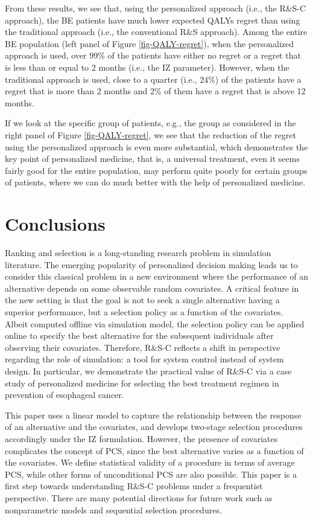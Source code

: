 \documentclass[ijoc,nonblindrev]{informs3}
\begin{document}
From these results, we see that, using the personalized approach (i.e., the R\&S-C approach), the BE patients have much lower expected QALYs regret than using the traditional approach (i.e., the conventional R\&S approach).
Among the entire BE population (left panel of Figure \ref{fig-QALY-regret}),
when the personalized approach is used, over 99\% of the patients have either no regret or a regret that is less than or equal to 2 months (i.e., the IZ parameter).
However, when the traditional approach is used, close to a quarter (i.e., 24\%) of the patients have a regret that  is more than 2 months and 2\% of them have a regret that is above 12 months.


If we look at the specific group of patients, e.g., the group as considered in the right panel of Figure \ref{fig-QALY-regret},
we see that the reduction of the regret using the personalized approach is even more substantial, which demonstrates the key point of personalized medicine,
that is, a universal treatment, even it seems fairly good for the entire population, may perform quite poorly for certain groups of patients, where we can do much better with the help of personalized medicine.


\section{Conclusions} \label{sec-conclusion}

Ranking and selection is a long-standing research problem in simulation literature.
The emerging popularity of personalized decision making leads us to consider this classical problem in a new environment where the performance of an alternative depends on some observable random covariates.
A critical feature in the new setting is that the goal is not to seek a single alternative having a superior performance, but a selection policy as a function of the covariates.
Albeit computed offline via simulation model, the selection policy can be applied online to specify the best alternative for the subsequent individuals after observing their covariates.
Therefore, R\&S-C reflects a shift in perspective regarding the role of simulation:  a tool for system control instead of system design.
In particular, we demonstrate the practical value of R\&S-C via a case study of personalized medicine for selecting the best treatment regimen in prevention of esophageal cancer.

This paper uses a linear model to capture the relationship between the response of an alternative and the covariates, and develops two-stage selection procedures accordingly under the IZ formulation.
However, the presence of covariates complicates the concept of PCS, since the best alternative varies as a function of the covariates.
We define statistical validity of a procedure in terms of average PCS, while other forms of unconditional PCS are also possible.
This paper is a first step towards understanding R\&S-C problems under a frequentist perspective.
There are many potential directions for future work such as nonparametric models and sequential selection procedures.
\end{document}
